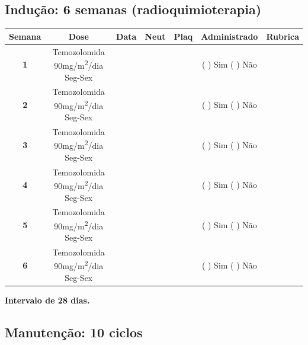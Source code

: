\documentclass[11pt,a4paper,oldfontcommands]{memoir}
\begin{document}
\hfill \\

\hfill  {}\\

\subsection{Indução: 6 semanas (radioquimioterapia)}

\renewcommand{\arraystretch}{1.5}

\begin{center}
\begin{longtable}{p{1cm}c|c|c|c|c|c}
	\hline
\multicolumn{1}{c|}{\multirow{1}{*}{\textbf{Semana}}}&{Dose}&{Data}&{Neut}&{Plaq}&{Administrado}&{Rubrica} \\
    \hline
    \multicolumn{1}{c|}{\multirow{1}{*}{\textbf{1}}}&{Temozolomida 90mg/m\textsuperscript{2}/dia Seg-Sex}&{}&&&{(  ) Sim (  ) Não}&\\
    \cline{3-5}
    \multicolumn{1}{c|}{\multirow{1}{*}{{\textbf{2}}}}&{Temozolomida 90mg/m\textsuperscript{2}/dia Seg-Sex}&{}&&&{(  ) Sim (  ) Não}&\\
    \cline{3-5}
    \multicolumn{1}{c|}{\multirow{1}{*}{{\textbf{3}}}}&{Temozolomida 90mg/m\textsuperscript{2}/dia Seg-Sex}&{}&&&{(  ) Sim (  ) Não}&\\
    \cline{3-5}
    \multicolumn{1}{c|}{\multirow{1}{*}{{\textbf{4}}}}&{Temozolomida 90mg/m\textsuperscript{2}/dia Seg-Sex}&{}&&&{(  ) Sim (  ) Não}&\\
    \cline{3-5}
    \multicolumn{1}{c|}{\multirow{1}{*}{{\textbf{5}}}}&{Temozolomida 90mg/m\textsuperscript{2}/dia Seg-Sex}&{}&&&{(  ) Sim (  ) Não}&\\
    \cline{3-5}
    \multicolumn{1}{c|}{\multirow{1}{*}{{\textbf{6}}}}&{Temozolomida 90mg/m\textsuperscript{2}/dia Seg-Sex}&{}&&&{(  ) Sim (  ) Não}&\\
    \hline
\end{longtable}
\textbf{Intervalo de 28 dias.}
\end{center}
\clearpage
\subsection{Manutenção: 10 ciclos}
\end{document}
